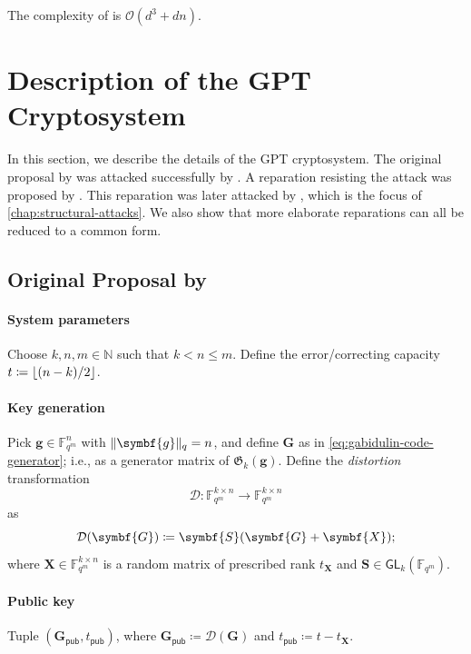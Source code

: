 \documentclass[version=last, paper=A4, parskip=half, oneside]{scrbook}
\theoremstyle{plain}
\theoremstyle{definition}
\theoremstyle{remark}
\renewcommand*{\vec}{\symbf}
\newcommand*{\mat}{\symbf}
\newcommand*{\GL}{\ensuremath{\mathsf{GL}}}
\newcommand*{\pub}{\ensuremath{\mathsf{pub}}}
\newcommand*{\FF}{\ensuremath{\mathbb{F}}}
\newcommand*{\NN}{\ensuremath{\mathbb{N}}}
\newcommand*{\Gab}{\ensuremath{\mathfrak{G}}}
\DeclarePairedDelimiter{\floor}{\lfloor}{\rfloor}
\DeclarePairedDelimiter{\norm}{\lVert}{\rVert}
\newcommand*{\normR}[2]{\ensuremath{\norm{#1}_{#2}}}
\begin{document}
The complexity of  is
\(\mathcal{O}(d^3 + d n)\).

\section{Description of the GPT Cryptosystem}

In this section, we describe the details of the GPT cryptosystem.  The original
proposal by \textcite{GPT91} was attacked successfully by \textcite{Gib95,
  Gib96}.  A reparation resisting the attack was proposed by \textcite{GO01}.
This reparation was later attacked by \textcite{Ove05, Ove06, Ove08}, which is
the focus of \cref{chap:structural-attacks}.  We also show that more elaborate
reparations can all be reduced to a common form.

\subsection{Original Proposal by \texorpdfstring{\textcite{GPT91}}{Gabidulin,
    Paramonov, and Tretjakov}}

\paragraph{System parameters} Choose \(k, n, m \in \NN\) such that
\(k < n \le m\).  Define the error\-/correcting capacity
\(t \coloneqq \floor{(n - k) / {2}}\).

\paragraph{Key generation} Pick \(\vec{g} \in \FF_{q^m}^n\) with
\(\normR{\vec{g}}{q} = n\), and define \(\mat{G}\) as in
\cref{eq:gabidulin-code-generator}; i.e., as a generator matrix of
\(\Gab_k(\vec{g})\).  Define the \emph{distortion} transformation
\[
  \mathcal{D}\colon \FF_{q^m}^{k \times n} \to \FF_{q^m}^{k \times n}
\]
as
\[
  \mathcal{D}(\mat{G}) \coloneqq \mat{S}(\mat{G} + \mat{X})\text;
\]
where \(\mat{X} \in \FF_{q^m}^{k \times n}\) is a random matrix of prescribed
rank \(t_{\mat{X}}\) and \(\mat{S} \in \GL_k(\FF_{q^m})\).

\paragraph{Public key} Tuple \((\mat{G}_{\pub}, t_{\pub})\), where
\(\mat{G}_{\pub} \coloneqq \mathcal{D}(\mat{G})\) and
\(t_{\pub} \coloneqq t - t_{\mat{X}}\).
\end{document}
